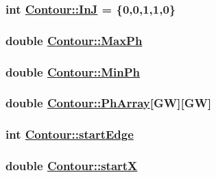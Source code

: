 \hypertarget{classContour_s1}{
\subsubsection[InJ]{\setlength{\rightskip}{0pt plus 5cm}int \hyperlink{classContour_s1}{Contour::In\-J} = \{0,0,1,1,0\}}}
\label{classContour_s1}


\hypertarget{classContour_o18}{
\subsubsection[MaxPh]{\setlength{\rightskip}{0pt plus 5cm}double \hyperlink{classContour_o18}{Contour::Max\-Ph}}}
\label{classContour_o18}


\hypertarget{classContour_o19}{
\subsubsection[MinPh]{\setlength{\rightskip}{0pt plus 5cm}double \hyperlink{classContour_o19}{Contour::Min\-Ph}}}
\label{classContour_o19}


\hypertarget{classContour_o13}{
\subsubsection[PhArray]{\setlength{\rightskip}{0pt plus 5cm}double \hyperlink{classContour_o13}{Contour::Ph\-Array}\mbox{[}GW\mbox{]}\mbox{[}GW\mbox{]}}}
\label{classContour_o13}


\hypertarget{classContour_o5}{
\subsubsection[startEdge]{\setlength{\rightskip}{0pt plus 5cm}int \hyperlink{classContour_o5}{Contour::start\-Edge}}}
\label{classContour_o5}


\hypertarget{classContour_o6}{
\subsubsection[startX]{\setlength{\rightskip}{0pt plus 5cm}double \hyperlink{classContour_o6}{Contour::start\-X}}}
\label{classContour_o6}


